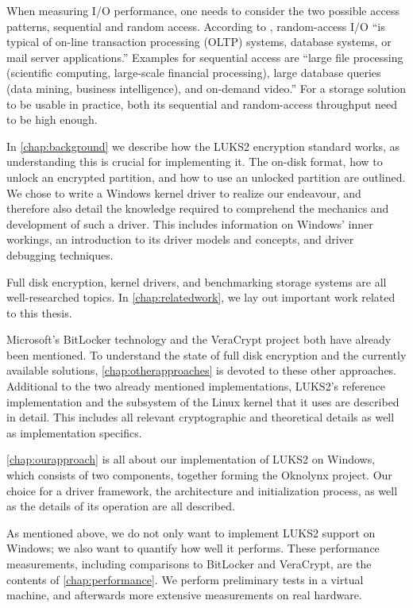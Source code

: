 When measuring I/O performance, one needs to consider the two possible access patterns, sequential and random access. According to \cite{Traeger2008}, random-access I/O ``is typical of on-line transaction processing (OLTP) systems, database systems, or mail server applications.'' Examples for sequential access are ``large file processing (scientific computing, large-scale financial processing), large database queries (data mining, business intelligence), and on-demand video.'' For a storage solution to be usable in practice, both its sequential and random-access throughput need to be high enough.

In \autoref{chap:background} we describe how the LUKS2 encryption standard works, as understanding this is crucial for implementing it. The on-disk format, how to unlock an encrypted partition, and how to use an unlocked partition are outlined. We chose to write a Windows kernel driver to realize our endeavour, and therefore also detail the knowledge required to comprehend the mechanics and development of such a driver. This includes information on Windows' inner workings, an introduction to its driver models and concepts, and driver debugging techniques.

Full disk encryption, kernel drivers, and benchmarking storage systems are all well-researched topics. In \autoref{chap:relatedwork}, we lay out important work related to this thesis.

Microsoft's BitLocker technology and the VeraCrypt project both have already been mentioned. To understand the state of full disk encryption and the currently available solutions, \autoref{chap:otherapproaches} is devoted to these other approaches. Additional to the two already mentioned implementations, LUKS2's reference implementation and the subsystem of the Linux kernel that it uses are described in detail. This includes all relevant cryptographic and theoretical details as well as implementation specifics.

\autoref{chap:ourapproach} is all about our implementation of LUKS2 on Windows, which consists of two components, together forming the Oknolynx project. Our choice for a driver framework, the architecture and initialization process, as well as the details of its operation are all described.

As mentioned above, we do not only want to implement LUKS2 support on Windows; we also want to quantify how well it performs. These performance measurements, including comparisons to BitLocker and VeraCrypt, are the contents of \autoref{chap:performance}. We perform preliminary tests in a virtual machine, and afterwards more extensive measurements on real hardware.

